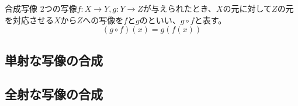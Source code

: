 \documentclass[../../../topic_linear-algebra]{subfiles}
\begin{document}
\begin{definition}{合成写像}
  2つの写像$f\colon X \to Y, g\colon Y \to Z$が与えられたとき、$X$の元に対して$Z$の元を対応させる$X$から$Z$への写像を$f$と$g$のといい、$g \circ f$と表す。
  \begin{equation*}
    (g \circ f)(x) = g(f(x))
  \end{equation*}
\end{definition}

\subsection{単射な写像の合成}

\begin{mindflow}
\end{mindflow}

\subsection{全射な写像の合成}

\begin{mindflow}
\end{mindflow}
\end{document}
